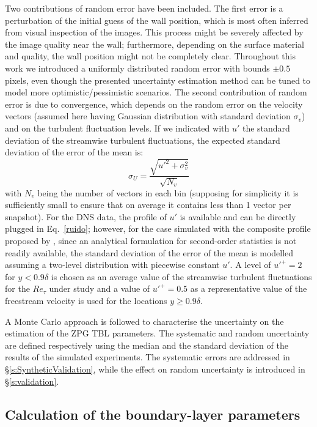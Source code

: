 Two contributions of random error have been included. The first error is a perturbation of the initial guess of the wall position, which is most often inferred from visual inspection of the images. This process might be severely affected by the image quality near the wall; furthermore, depending on the surface material and quality, the wall position might not be completely clear. {Throughout this work} we introduced a uniformly distributed random error with bounds $\pm0.5$ pixels, even though the presented uncertainty estimation method can be tuned to model more optimistic/pessimistic scenarios. The second contribution of random error is due to convergence, which depends on the random error on the velocity vectors (assumed here having Gaussian distribution with standard deviation $\sigma_v$) and on the turbulent fluctuation levels. If we indicated with $u'$ the standard deviation of the streamwise turbulent fluctuations, the expected standard deviation of the error of the mean is:
\begin{equation}
\label{ruido}
    \sigma_{U}=\frac{\sqrt{u'^2+\sigma_v^2}}{\sqrt{N_v}}    
\end{equation}
with $N_v$ being the number of vectors in each bin (supposing for simplicity it is sufficiently small to ensure that on average it contains less than 1 vector per snapshot). 
For the DNS data, the profile of $u'$ is available and can be directly plugged in Eq.~\ref{ruido}; however, for the case simulated with the composite profile proposed by \citet{Chauhan:2009p10824}, since an analytical formulation for second-order statistics is not readily available, the standard deviation of the error of the mean is modelled assuming a two-level distribution with piecewise constant $u'$. A level of $u'^+=2$ for $y<0.9 \delta$ is chosen as an average value of the streamwise turbulent fluctuations for the $Re_\tau$ under study and a value of $u'^+=0.5$ as a representative value of the freestream velocity is used for the locations $y\geq 0.9 \delta$.

A {Monte Carlo} approach is followed to characterise the uncertainty on the estimation of the {ZPG }TBL parameters. The systematic and random uncertainty are defined respectively using the median and the standard deviation of the results of the simulated experiments. {The systematic errors are addressed in \S \ref{s:SyntheticValidation}, while the effect on random uncertainty is introduced in \S \ref{s:validation}.}

\subsection{Calculation of the boundary-layer parameters}
\label{s:composite_profile}

